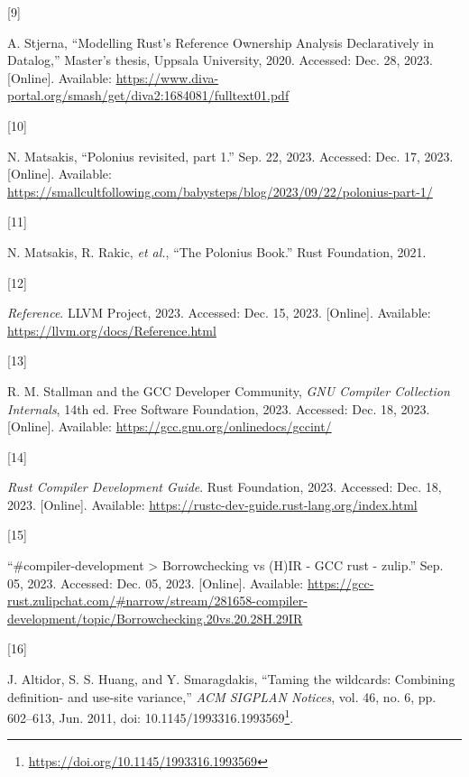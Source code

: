 \documentclass[
  11pt,
  twoside,symmetric]{report}
\newlength{\cslhangindent}
\newlength{\csllabelwidth}
\newenvironment{CSLReferences}[2] %
 {\begin{list}{}{%
  \setlength{\itemindent}{0pt}
  \setlength{\leftmargin}{0pt}
  \setlength{\parsep}{0pt}
  \ifodd #1
   \setlength{\leftmargin}{\cslhangindent}
   \setlength{\itemindent}{-1\cslhangindent}
  \fi
  \setlength{\itemsep}{#2\baselineskip}}}
 {\end{list}}
\newcommand{\CSLLeftMargin}[1]{\parbox[t]{\csllabelwidth}{\strut#1\strut}}
\newcommand{\CSLRightInline}[1]{\parbox[t]{\linewidth - \csllabelwidth}{\strut#1\strut}}
\DeclareRobustCommand{\href}[2]{#2\footnote{\url{#1}}}
\begin{document}
\begin{CSLReferences}{0}{0}
\CSLLeftMargin{{[}9{]} }%
\CSLRightInline{A. Stjerna, {``{M}odelling {R}ust's {R}eference
{O}wnership {A}nalysis {D}eclaratively in {D}atalog,''} Master's thesis,
Uppsala University, 2020. Accessed: Dec. 28, 2023. {[}Online{]}.
Available:
\url{https://www.diva-portal.org/smash/get/diva2:1684081/fulltext01.pdf}}

\CSLLeftMargin{{[}10{]} }%
\CSLRightInline{N. Matsakis, {``Polonius revisited, part 1.''} Sep. 22,
2023. Accessed: Dec. 17, 2023. {[}Online{]}. Available:
\url{https://smallcultfollowing.com/babysteps/blog/2023/09/22/polonius-part-1/}}

\CSLLeftMargin{{[}11{]} }%
\CSLRightInline{N. Matsakis, R. Rakic, \emph{et al.}, {``{T}he
{P}olonius {B}ook.''} Rust Foundation, 2021.}

\CSLLeftMargin{{[}12{]} }%
\CSLRightInline{\emph{Reference}. LLVM Project, 2023. Accessed: Dec. 15,
2023. {[}Online{]}. Available:
\url{https://llvm.org/docs/Reference.html}}

\CSLLeftMargin{{[}13{]} }%
\CSLRightInline{R. M. Stallman and the GCC Developer Community,
\emph{{GNU} {C}ompiler {C}ollection {I}nternals}, 14th ed. Free Software
Foundation, 2023. Accessed: Dec. 18, 2023. {[}Online{]}. Available:
\url{https://gcc.gnu.org/onlinedocs/gccint/}}

\CSLLeftMargin{{[}14{]} }%
\CSLRightInline{\emph{{R}ust {C}ompiler {D}evelopment {G}uide}. Rust
Foundation, 2023. Accessed: Dec. 18, 2023. {[}Online{]}. Available:
\url{https://rustc-dev-guide.rust-lang.org/index.html}}

\CSLLeftMargin{{[}15{]} }%
\CSLRightInline{{``{\#}{c}ompiler-development \textgreater{}
{B}orrowchecking vs ({H})IR - GCC rust - zulip.''} Sep. 05, 2023.
Accessed: Dec. 05, 2023. {[}Online{]}. Available:
\url{https://gcc-rust.zulipchat.com/\#narrow/stream/281658-compiler-development/topic/Borrowchecking.20vs.20.28H.29IR}}

\CSLLeftMargin{{[}16{]} }%
\CSLRightInline{J. Altidor, S. S. Huang, and Y. Smaragdakis, {``Taming
the wildcards: Combining definition- and use-site variance,''} \emph{ACM
SIGPLAN Notices}, vol. 46, no. 6, pp. 602--613, Jun. 2011, doi:
\href{https://doi.org/10.1145/1993316.1993569}{10.1145/1993316.1993569}.}


\end{CSLReferences}
\end{document}
